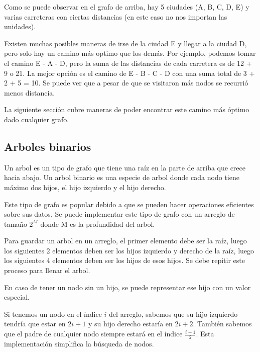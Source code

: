 \documentclass{article}
\begin{document}
Como se puede observar en el grafo de arriba, hay 5 ciudades (A, B, C, D, E) y varias carreteras con ciertas distancias (en este caso no nos importan las unidades).

Existen muchas posibles maneras de irse de la ciudad E y llegar a la ciudad D, pero solo hay un camino más optimo que los demás. Por ejemplo, podemos tomar el camino E - A - D, pero la suma de las distancias de cada carretera es de 12 + 9 o 21. La mejor opción es el camino de E - B - C - D con una suma total de 3 + 2 + 5 = 10. Se puede ver que a pesar de que se visitaron más nodos se recurrió menos distancia.

La siguiente sección cubre maneras de poder encontrar este camino más óptimo dado cualquier grafo.

\subsection{Arboles binarios}

Un arbol es un tipo de grafo que tiene una raíz en la parte de arriba que crece hacia abajo. Un arbol binario es una especie de arbol donde cada nodo tiene máximo dos hijos, el hijo izquierdo y el hijo derecho.

Este tipo de grafo es popular debido a que se pueden hacer operaciones eficientes sobre sus datos. Se puede implementar este tipo de grafo con un arreglo de tamaño $2^M$ donde M es la profundidad del arbol.

Para guardar un arbol en un arreglo, el primer elemento debe ser la raíz, luego los siguientes 2 elementos deben ser los hijos izquierdo y derecho de la raíz, luego los siguientes 4 elementos deben ser los hijos de esos hijos. Se debe repitir este proceso para llenar el arbol.

En caso de tener un nodo sin un hijo, se puede representar ese hijo con un valor especial.

Si tenemos un nodo en el índice $i$ del arreglo, sabemos que su hijo izquierdo tendría que estar en $2i + 1$ y su hijo derecho estaría en $2i + 2$. También sabemos que el padre de cualquier nodo siempre estará en el índice $\frac{i - 1}{2}$. Esta implementación simplifica la búsqueda de nodos.
\end{document}

